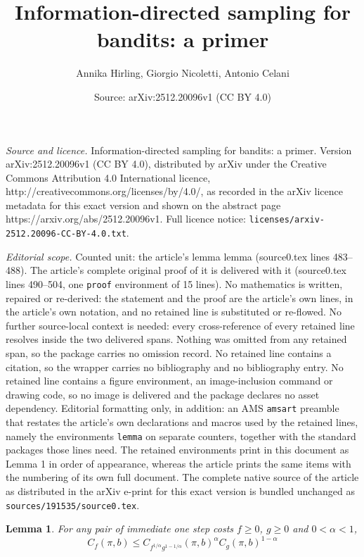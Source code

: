 \documentclass[10pt,a4paper]{amsart}
\title{Information-directed sampling for bandits: a primer}
\author{Annika Hirling, Giorgio Nicoletti, Antonio Celani}
\date{Source: arXiv:2512.20096v1 (CC BY 4.0)}
\newtheorem{lemma}{Lemma}
\begin{document}
\maketitle

\noindent\emph{Source and licence.} Information-directed sampling for bandits: a primer. Version arXiv:2512.20096v1 (CC BY 4.0), distributed by arXiv under the Creative Commons Attribution 4.0 International licence, http://creativecommons.org/licenses/by/4.0/, as recorded in the arXiv licence metadata for this exact version and shown on the abstract page https://arxiv.org/abs/2512.20096v1. Full licence notice: \texttt{licenses/arxiv-2512.20096-CC-BY-4.0.txt}.\par\smallskip

\noindent\textit{Editorial scope.} Counted unit: the article's lemma lemma (source0.tex lines 483--488). The article's complete original proof of it is delivered with it (source0.tex lines 490--504, one \texttt{proof} environment of 15 lines). No mathematics is written, repaired or re-derived: the statement and the proof are the article's own lines, in the article's own notation, and no retained line is substituted or re-flowed.  No further source-local context is needed: every cross-reference of every retained line resolves inside the two delivered spans.  Nothing was omitted from any retained span, so the package carries no omission record.  No retained line contains a citation, so the wrapper carries no bibliography and no bibliography entry.  No retained line contains a figure environment, an image-inclusion command or drawing code, so no image is delivered and the package declares no asset dependency.  Editorial formatting only, in addition: an AMS \texttt{amsart} preamble that restates the article's own declarations and macros used by the retained lines, namely the environments \texttt{lemma} on separate counters, together with the standard packages those lines need.  The retained environments print in this document as Lemma 1 in order of appearance, whereas the article prints the same items with the numbering of its own full document.  The complete native source of the article as distributed in the arXiv e-print for this exact version is bundled unchanged as \texttt{sources/191535/source0.tex}.
\begin{lemma}
For any pair of immediate one step costs $f\geq0$, $g\geq0$ and $0<\alpha<1$,
\begin{equation}
    C_f(\pi,b)\leq C_{f^{1/\alpha}g^{1-1/\alpha}}(\pi,b)^\alpha C_g(\pi,b)^{1-\alpha}
\end{equation}
\end{lemma}
\end{document}
